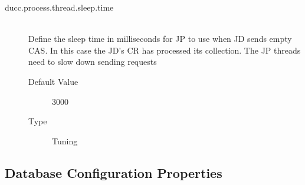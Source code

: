 \begin{description}
      \item[ducc.process.thread.sleep.time] \hfill \\
        Define the sleep time in milliseconds for JP to use when JD sends empty CAS. In this case the
        JD's CR has processed its collection. The JP threads need to slow down sending
        requests
        \begin{description}
          \item[Default Value] 3000
          \item[Type] Tuning
        \end{description}


      \end{description}
      

\subsection{Database Configuration Properties}
\label{subsec:ducc.database.properties}

